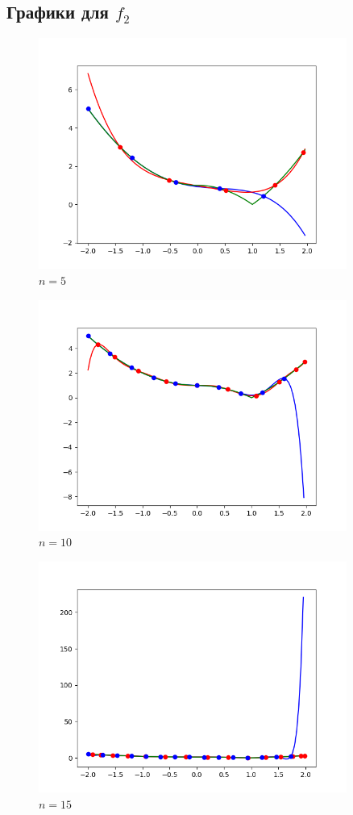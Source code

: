 \documentclass{article}
\begin{document}
\subsection*{Графики для $f_2$}
\begin{figure}[H]
\caption{$n=5$}
\centering
\includegraphics[width=0.9\textwidth]{f2_5}
\end{figure}
\begin{figure}[H]
\caption{$n=10$}
\centering
\includegraphics[width=0.9\textwidth]{f2_10.png}
\end{figure}
\begin{figure}[H]
\caption{$n=15$}
\centering
\includegraphics[width=0.9\textwidth]{f2_15}
\end{figure}
\end{document}
